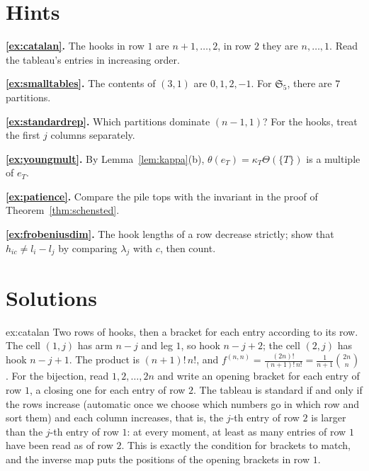 \section{Hints}

\noindent\textbf{\ref{ex:catalan}.} The hooks in row $1$ are $n+1,\dots,2$, in row $2$ they are $n,\dots,1$. Read the tableau's entries in increasing order.

\noindent\textbf{\ref{ex:smalltables}.} The contents of $(3,1)$ are $0,1,2,-1$. For $\mathfrak S_5$, there are $7$ partitions.

\noindent\textbf{\ref{ex:standardrep}.} Which partitions dominate $(n-1,1)$? For the hooks, treat the first $j$ columns separately.

\noindent\textbf{\ref{ex:youngmult}.} By Lemma~\ref{lem:kappa}(b), $\theta(e_T)=\kappa_T\Theta(\{T\})$ is a multiple of $e_T$.

\noindent\textbf{\ref{ex:patience}.} Compare the pile tops with the invariant in the proof of Theorem~\ref{thm:schensted}.

\noindent\textbf{\ref{ex:frobeniusdim}.} The hook lengths of a row decrease strictly; show that $h_{ic}\ne l_i-l_j$ by comparing $\lambda_j$ with $c$, then count.

\section{Solutions}

\begin{solution}{ex:catalan}
\idea Two rows of hooks, then a bracket for each entry according to its row.
\writeup The cell $(1,j)$ has arm $n-j$ and leg $1$, so hook $n-j+2$; the cell $(2,j)$ has hook $n-j+1$. The product is $(n+1)!\,n!$, and $f^{(n,n)}=\frac{(2n)!}{(n+1)!\,n!}=\frac1{n+1}\binom{2n}n$. For the bijection, read $1,2,\dots,2n$ and write an opening bracket
for each entry of row $1$, a closing one for each entry of row $2$. The tableau is standard if and only if the rows increase (automatic once we choose which numbers go in which row and sort them) and each column increases, that is, the $j$-th
entry of row $2$ is larger than the $j$-th entry of row $1$: at every moment, at least as many entries of row $1$ have been read as of row $2$. This is exactly the condition for brackets to match, and the inverse map puts the positions of
the opening brackets in row $1$.
\end{solution}

